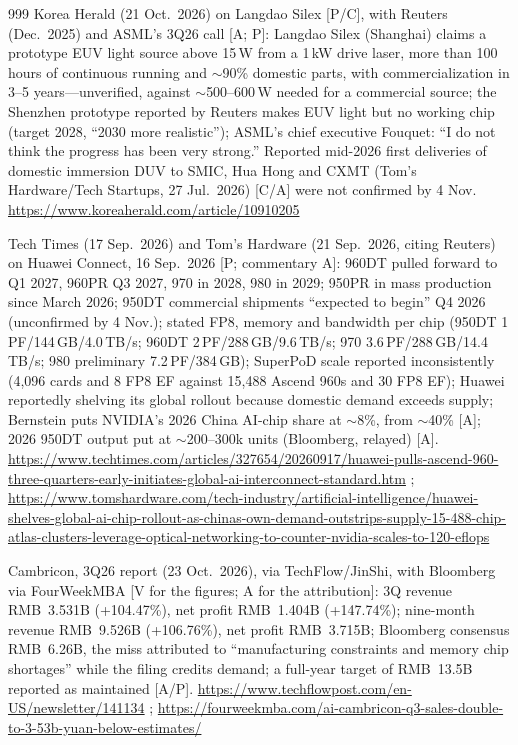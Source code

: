 \begin{thebibliography}{999}
 Korea Herald (21 Oct.\ 2026) on Langdao Silex [P/C], with Reuters (Dec.\ 2025) and ASML's 3Q26 call [A; P]: Langdao Silex (Shanghai) claims a prototype EUV light source above 15\,W from a 1\,kW drive laser, more than 100 hours of continuous running and $\sim$90\% domestic parts, with commercialization in 3--5 years---unverified, against $\sim$500--600\,W needed for a commercial source; the Shenzhen prototype reported by Reuters makes EUV light but no working chip (target 2028, ``2030 more realistic''); ASML's chief executive Fouquet: ``I do not think the progress has been very strong.'' Reported mid-2026 first deliveries of domestic immersion DUV to SMIC, Hua Hong and CXMT (Tom's Hardware/Tech Startups, 27 Jul.\ 2026) [C/A] were not confirmed by 4 Nov. \url{https://www.koreaherald.com/article/10910205}

 Tech Times (17 Sep.\ 2026) and Tom's Hardware (21 Sep.\ 2026, citing Reuters) on Huawei Connect, 16 Sep.\ 2026 [P; commentary A]: 960DT pulled forward to Q1 2027, 960PR Q3 2027, 970 in 2028, 980 in 2029; 950PR in mass production since March 2026; 950DT commercial shipments ``expected to begin'' Q4 2026 (unconfirmed by 4 Nov.); stated FP8, memory and bandwidth per chip (950DT 1\,PF/144\,GB/4.0\,TB/s; 960DT 2\,PF/288\,GB/9.6\,TB/s; 970 3.6\,PF/288\,GB/14.4\,TB/s; 980 preliminary 7.2\,PF/384\,GB); SuperPoD scale reported inconsistently (4,096 cards and 8 FP8 EF against 15,488 Ascend 960s and 30 FP8 EF); Huawei reportedly shelving its global rollout because domestic demand exceeds supply; Bernstein puts NVIDIA's 2026 China AI-chip share at $\sim$8\%, from $\sim$40\% [A]; 2026 950DT output put at $\sim$200--300k units (Bloomberg, relayed) [A]. \url{https://www.techtimes.com/articles/327654/20260917/huawei-pulls-ascend-960-three-quarters-early-initiates-global-ai-interconnect-standard.htm} ; \url{https://www.tomshardware.com/tech-industry/artificial-intelligence/huawei-shelves-global-ai-chip-rollout-as-chinas-own-demand-outstrips-supply-15-488-chip-atlas-clusters-leverage-optical-networking-to-counter-nvidia-scales-to-120-eflops}

 Cambricon, 3Q26 report (23 Oct.\ 2026), via TechFlow/JinShi, with Bloomberg via FourWeekMBA [V for the figures; A for the attribution]: 3Q revenue RMB~3.531B (+104.47\%), net profit RMB~1.404B (+147.74\%); nine-month revenue RMB~9.526B (+106.76\%), net profit RMB~3.715B; Bloomberg consensus RMB~6.26B, the miss attributed to ``manufacturing constraints and memory chip shortages'' while the filing credits demand; a full-year target of RMB~13.5B reported as maintained [A/P]. \url{https://www.techflowpost.com/en-US/newsletter/141134} ; \url{https://fourweekmba.com/ai-cambricon-q3-sales-double-to-3-53b-yuan-below-estimates/}


\end{thebibliography}
